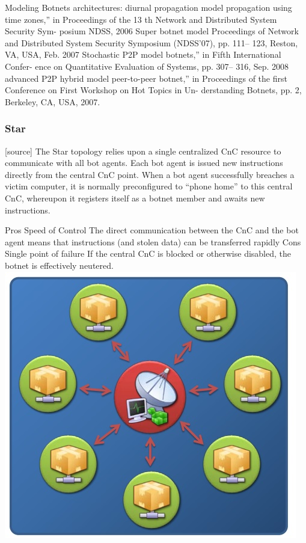 Modeling Botnets architectures:
diurnal propagation model %
propagation using time zones,” in Proceedings of the 13 th Network and Distributed System
Security Sym- posium NDSS, 2006
Super botnet model %
Proceedings of Network and Distributed System Security Symposium (NDSS’07), pp. 111–
123, Reston, VA, USA, Feb. 2007
Stochastic P2P model %
botnets,” in Fifth International Confer- ence on Quantitative Evaluation of Systems, pp. 307–
316, Sep. 2008 %
advanced P2P hybrid model %
peer-to-peer botnet,” in Proceedings of the first Conference on First Workshop on Hot Topics
in Un- derstanding Botnets, pp. 2, Berkeley, CA, USA, 2007.

\subsubsection{Star}
[source]
The Star topology relies upon a single centralized CnC resource to communicate with
all bot agents. Each bot agent is issued new instructions directly from the central CnC
point. When a bot agent successfully breaches a victim computer, it is normally
preconfigured to “phone home” to this central CnC, whereupon it registers itself as a
botnet member and awaits new instructions.

    Pros 
Speed of Control
The direct communication between the CnC and the bot agent means that instructions (and stolen data) can be transferred rapidly
    Cons
Single point of failure
If the central CnC is blocked or otherwise disabled, the botnet is effectively neutered.\\
\includegraphics[scale=1]{img/star_topo.jpg}

